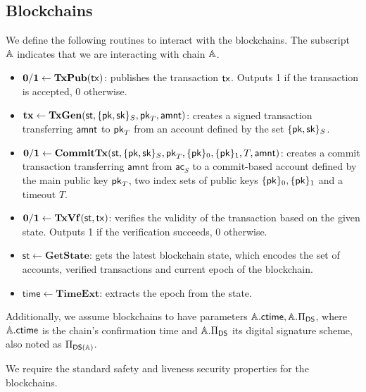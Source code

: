 \subsection{Blockchains}

We define the following routines to interact with the blockchains. The subscript $\mathbb{A}$ indicates that we are interacting with chain $\mathbb{A}$.

\begin{itemize}[topsep=0pt, itemsep=0pt, leftmargin=2em]
    \item $\mathbf{0/1} \gets \mathbf{TxPub}(\mathsf{tx})$: publishes the transaction $\mathsf{tx}$. Outputs 1 if the transaction is accepted, 0 otherwise.
    \item $\mathbf{tx}  \gets \mathbf{TxGen}(\st, \{ \pk, \sk \}_S, \pk_T, \amnt)$: creates a signed transaction transferring $\mathsf{amnt}$ to $\mathsf{pk}_T$ from an account defined by the set $\{ \mathsf{pk}, \mathsf{sk} \}_S$.
\item $\mathbf{0/1} \gets \mathbf{CommitTx}(\st, \{ \pk, \sk \}_S, \mathsf{pk}_T, \{ \pk \}_0, \{ \pk \}_1, T, \amnt)$: creates a commit transaction transferring $\mathsf{amnt}$ from $\mathsf{ac}_S$ to a commit-based account defined by the main public key $\mathsf{pk}_T$, two index sets of public keys $\{ \mathsf{pk} \}_0, \{ \mathsf{pk} \}_1$ and a timeout $T$.
    \item $\mathbf{0/1} \gets \mathbf{TxVf}(\st, \tx)$: verifies the validity of the transaction based on the given state. Outputs 1 if the verification succeeds, 0 otherwise.
    \item $\mathsf{st} \gets \mathbf{GetState}$: gets the latest blockchain state, which encodes the set of accounts, verified transactions and current epoch of the blockchain.
    \item $\mathsf{time} \gets \mathbf{TimeExt}$: extracts the epoch from the state.
\end{itemize}

Additionally, we assume blockchains to have parameters $\mathbb{A}.\mathsf{ctime}, \mathbb{A}.\Pi_\mathsf{DS}$, where $\mathbb{A}.\mathsf{ctime}$ is the chain's confirmation time and $\mathbb{A}.\Pi_\mathsf{DS}$ its digital signature scheme, also noted as $\Pi_\mathsf{DS(\mathbb{A})}$.

We require the standard safety and liveness security properties for the blockchains.

